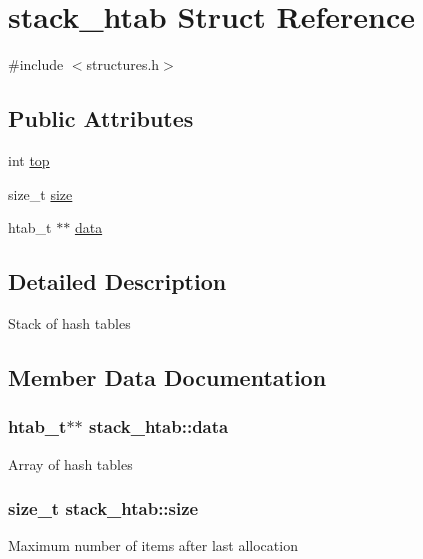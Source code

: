 \hypertarget{structstack__htab}{}\section{stack\+\_\+htab Struct Reference}
\label{structstack__htab}


{\ttfamily \#include $<$structures.\+h$>$}

\subsection*{Public Attributes}
\begin{DoxyCompactItemize}
\item 
int \hyperlink{structstack__htab_a1bb9f9cb590d2082d0b202f0be999a74}{top}
\item 
size\+\_\+t \hyperlink{structstack__htab_a95f7b033f614ca5941b0f3b2237c059e}{size}
\item 
htab\+\_\+t $\ast$$\ast$ \hyperlink{structstack__htab_a88d95f776e47e2eb2005e7ee11330b3f}{data}
\end{DoxyCompactItemize}


\subsection{Detailed Description}
Stack of hash tables 

\subsection{Member Data Documentation}
\subsubsection[{\texorpdfstring{data}{data}}]{\setlength{\rightskip}{0pt plus 5cm}htab\+\_\+t$\ast$$\ast$ stack\+\_\+htab\+::data}\hypertarget{structstack__htab_a88d95f776e47e2eb2005e7ee11330b3f}{}\label{structstack__htab_a88d95f776e47e2eb2005e7ee11330b3f}
Array of hash tables 
\subsubsection[{\texorpdfstring{size}{size}}]{\setlength{\rightskip}{0pt plus 5cm}size\+\_\+t stack\+\_\+htab\+::size}\hypertarget{structstack__htab_a95f7b033f614ca5941b0f3b2237c059e}{}\label{structstack__htab_a95f7b033f614ca5941b0f3b2237c059e}
Maximum number of items after last allocation 
